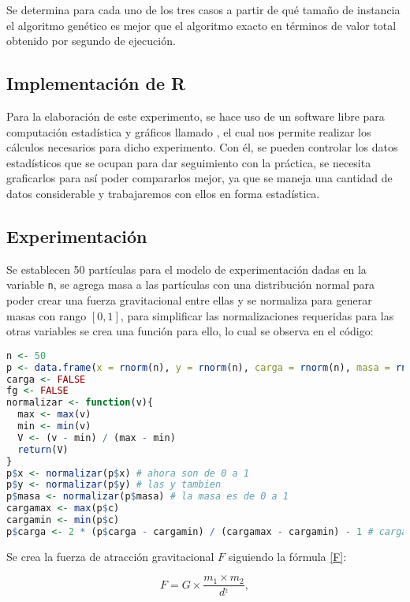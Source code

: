 \documentclass{article}
\begin{document}
Se determina para cada uno de los tres casos a partir de qu\'e tama\~no de instancia el algoritmo gen\'etico es mejor que el algoritmo exacto en t\'erminos de valor total obtenido por segundo de ejecuci\'on.

\newpage

\subsection{Implementaci\'on de R}
Para la elaboraci\'on de este experimento, se hace uso de un software libre para computaci\'on estad\'istica y gr\'aficos llamado \citet{R}, el cual nos permite realizar los c\'alculos necesarios para dicho experimento. Con \'el, se pueden controlar los datos estad\'isticos que se ocupan para dar seguimiento con la pr\'actica, se necesita graficarlos para as\'i poder compararlos mejor, ya que se maneja una cantidad de datos considerable y trabajaremos con ellos en forma estad\'istica.

\subsection{Experimentaci\'on}

Se establecen 50 part\'iculas para el modelo de experimentaci\'on dadas en la variable \texttt{n}, se agrega masa a las part\'iculas con una distribuci\'on normal para poder crear una fuerza gravitacional entre ellas y se normaliza para generar masas con rango $[0,1]$, para simplificar las normalizaciones requeridas para las otras variables se crea una funci\'on para ello, lo cual se observa en el c\'odigo:

\begin{lstlisting}[language=R]
n <- 50
p <- data.frame(x = rnorm(n), y = rnorm(n), carga = rnorm(n), masa = rnorm(n))
carga <- FALSE
fg <- FALSE
normalizar <- function(v){
  max <- max(v)
  min <- min(v)
  V <- (v - min) / (max - min)
  return(V)
}
p$x <- normalizar(p$x) # ahora son de 0 a 1
p$y <- normalizar(p$y) # las y tambien
p$masa <- normalizar(p$masa) # la masa es de 0 a 1
cargamax <- max(p$c)
cargamin <- min(p$c)
p$carga <- 2 * (p$carga - cargamin) / (cargamax - cargamin) - 1 # cargas son entre -1 y 1
\end{lstlisting}

Se crea la fuerza de atracci\'on gravitacional $F$ siguiendo la f\'ormula \eqref{F}:

\begin{equation}
F = G \times \frac{m_{1} \times m_{2}}{d^{_{2}}},
\label{F}
\end{equation}
\end{document}
